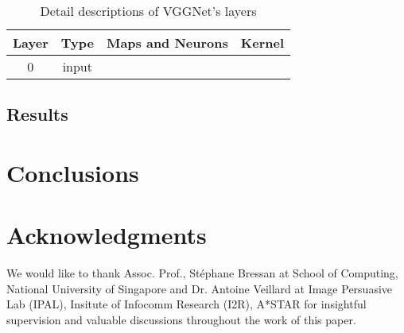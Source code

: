 \documentclass{sig-alternate}
\begin{document}

              \begin{table}
              \centering
              \caption{Detail descriptions of VGGNet's layers}
              \begin{tabular}{c|c|c|c} \hline
                     Layer & Type & Maps and Neurons & Kernel\\ \hline
                     0 & input & 
              \end{tabular}
              \end{table}
       \subsection{Results}
\section{Conclusions}


\section{Acknowledgments}
We would like to thank Assoc. Prof., St\'{e}phane Bressan at School of Computing, National University of Singapore and Dr. Antoine Veillard at Image Persuasive Lab (IPAL), Insitute of Infocomm Research (I2R), A*STAR for insightful supervision and valuable discussions throughout the work of this paper. 
\end{document}
